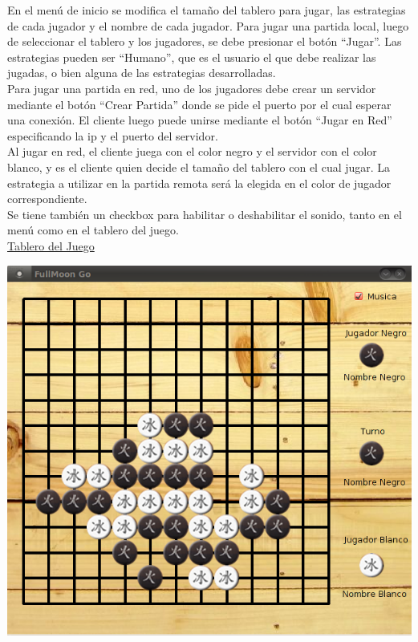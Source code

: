 \documentclass[11pt]{article}
\begin{document}
En el men\'u de inicio se modifica el tama\~no del tablero para jugar, las estrategias de cada jugador y el nombre de cada jugador.
Para jugar una partida local, luego de seleccionar el tablero y los jugadores, se debe presionar el bot\'on ``Jugar''. Las estrategias pueden ser
``Humano'', que es el usuario el que debe realizar las jugadas, o bien alguna de las estrategias desarrolladas. \\
Para jugar una partida en red, uno de los jugadores debe crear un servidor mediante el bot\'on ``Crear Partida'' donde se pide
el puerto por el cual esperar una conexi\'on. El cliente luego puede unirse mediante el bot\'on ``Jugar en Red'' especificando
la ip y el puerto del servidor.\\ 
Al jugar en red, el cliente juega con el color negro y el servidor con el color blanco, y es el cliente quien decide
el tama\~no del tablero con el cual jugar. La estrategia a utilizar en la partida remota ser\'a la elegida en el color de jugador correspondiente.\\

Se tiene tambi\'en un checkbox para habilitar o deshabilitar el sonido, tanto en el men\'u como en el tablero del juego. \\

\underline{Tablero del Juego}
\begin{center}
 \includegraphics[scale=0.55]{./Diagramas/captura_tablero.png}
\end{center}
\end{document}
